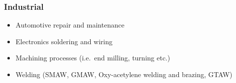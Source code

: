 \hypertarget{industrial}{%
\subsubsection{Industrial}\label{industrial}}

\begin{itemize}
\tightlist
\item
  Automotive repair and maintenance
\item
  Electronics soldering and wiring
\item
  Machining processes (i.e.~end milling, turning etc.)
\item
  Welding (SMAW, GMAW, Oxy-acetylene welding and brazing, GTAW)
\end{itemize}
